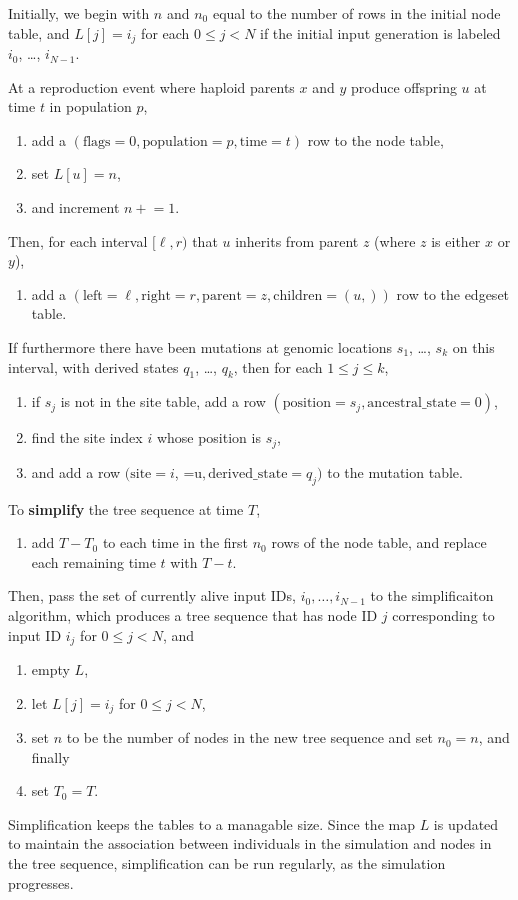 \documentclass{article}
\begin{document}
Initially, we begin with $n$ and $n_0$ equal to the number of rows in the initial node table,
and $L[j] = i_j$ for each $0 \le j < N$ if the initial input generation is labeled
$i_0$, \ldots, $i_{N-1}$.

At a reproduction event where haploid parents $x$ and $y$ produce offspring $u$
at time $t$ in population $p$,
\begin{enumerate}
    \item add a
        $(
        \text{flags}=0,
        \text{population}=p,
        \text{time}=t)$ row to the node table,
    \item set $L[u] = n$,
    \item and increment $n\mathrel{+}=1$.
\end{enumerate}
Then, for each interval $[\ell,r)$ that $u$ inherits from parent $z$
(where $z$ is either $x$ or $y$),
\begin{enumerate}[resume]
    \item add a
        $( \text{left}=\ell,
        \text{right}=r,
        \text{parent}=z,
        \text{children}=(u,))$ row to the edgeset table.
\end{enumerate}
If furthermore there have been mutations at genomic locations $s_1$, \ldots, $s_k$
on this interval,
with derived states $q_1$, \ldots, $q_k$,
then for each $1 \le j \le k$,
\begin{enumerate}[resume]
    \item if $s_j$ is not in the site table, add a row
        $( \text{position}=s_j,
        \text{ancestral\_state}=0)$,
    \item find the site index $i$ whose position is $s_j$,
    \item and add a row
        $( \text{site}=i$,
           =u$,
        \text{derived\_state}=q_j)$ to the mutation table.
\end{enumerate}

To \textbf{simplify} the tree sequence at time $T$,
\begin{enumerate}
    \item add $T-T_0$ to each time in the first $n_0$ rows of the node table,
        and replace each remaining time $t$ with $T-t$.
\end{enumerate}
Then, pass the set of currently alive input IDs,
$i_0, \ldots, i_{N-1}$ to the simplificaiton algorithm,
which produces a tree sequence that has node ID $j$ corresponding to input ID $i_j$
for $0 \le j < N$, and
\begin{enumerate}[resume]
    \item empty $L$,
    \item let $L[j] = i_j$ for $0 \le j < N$,
    \item set $n$ to be the number of nodes in the new tree sequence and set $n_0 = n$, and finally
    \item set $T_0 = T$.
\end{enumerate}

Simplification keeps the tables to a managable size.
Since the map $L$ is updated to maintain the association between individuals in the simulation
and nodes in the tree sequence, simplification can be run regularly,
as the simulation progresses.
\end{document}
